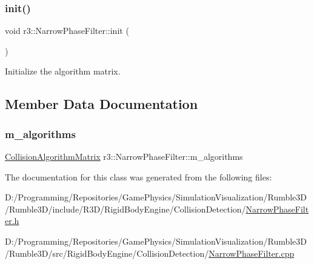 \subsubsection{\texorpdfstring{init()}{init()}}
{\footnotesize\ttfamily void r3\+::\+Narrow\+Phase\+Filter\+::init (\begin{DoxyParamCaption}{ }\end{DoxyParamCaption})\hspace{0.3cm}{\ttfamily [protected]}}



Initialize the algorithm matrix. 



\subsection{Member Data Documentation}
\mbox{\label{classr3_1_1_narrow_phase_filter_a476cf750e3cd55d9e36a011eb0c447af}} 
\subsubsection{\texorpdfstring{m\+\_\+algorithms}{m\_algorithms}}
{\footnotesize\ttfamily \mbox{\hyperlink{classr3_1_1_collision_algorithm_matrix}{Collision\+Algorithm\+Matrix}} r3\+::\+Narrow\+Phase\+Filter\+::m\+\_\+algorithms\hspace{0.3cm}{\ttfamily [protected]}}



The documentation for this class was generated from the following files\+:\begin{DoxyCompactItemize}
\item 
D\+:/\+Programming/\+Repositories/\+Game\+Physics/\+Simulation\+Visualization/\+Rumble3\+D/\+Rumble3\+D/include/\+R3\+D/\+Rigid\+Body\+Engine/\+Collision\+Detection/\mbox{\hyperlink{_narrow_phase_filter_8h}{Narrow\+Phase\+Filter.\+h}}\item 
D\+:/\+Programming/\+Repositories/\+Game\+Physics/\+Simulation\+Visualization/\+Rumble3\+D/\+Rumble3\+D/src/\+Rigid\+Body\+Engine/\+Collision\+Detection/\mbox{\hyperlink{_narrow_phase_filter_8cpp}{Narrow\+Phase\+Filter.\+cpp}}\end{DoxyCompactItemize}
